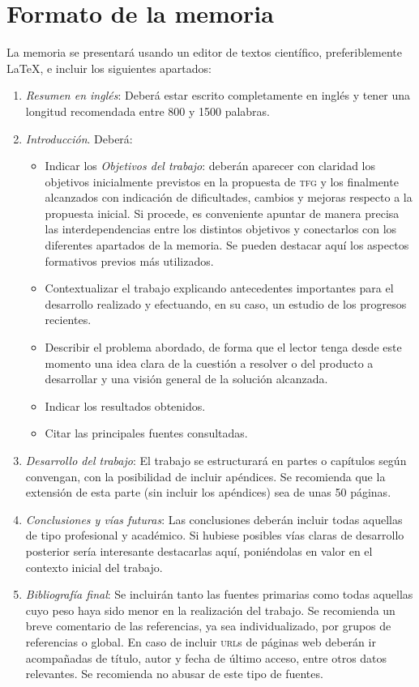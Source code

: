 \section{Formato de la memoria}
La memoria se presentará usando un editor de textos científico, preferiblemente \LaTeX, e incluir los siguientes apartados:
\begin{enumerate}
  \item \emph{Resumen en inglés}: Deberá estar escrito completamente en inglés y tener una longitud recomendada entre 800 y 1500 palabras. 
  \item \emph{Introducción}. Deberá:
    \begin{itemize}
      \item Indicar los \emph{Objetivos del trabajo}: deberán aparecer con claridad los objetivos inicialmente previstos en la propuesta de \textsc{tfg} y los finalmente alcanzados con indicación de dificultades, cambios y mejoras respecto a la propuesta inicial. Si procede, es conveniente apuntar de manera precisa las interdependencias entre los distintos objetivos y conectarlos con los diferentes apartados de la memoria. Se pueden destacar aquí los aspectos formativos previos más utilizados. 
    \item Contextualizar el trabajo explicando antecedentes importantes para el desarrollo realizado y efectuando, en su caso, un estudio de los progresos recientes.
    \item Describir el problema abordado, de forma que el lector tenga desde este momento una idea clara de la cuestión a resolver o del producto a desarrollar y una visión general de la solución alcanzada.
    \item Indicar los resultados obtenidos.
    \item Citar las principales fuentes consultadas.
    \end{itemize}

  \item \emph{Desarrollo del trabajo}: El trabajo se estructurará en partes o capítulos según convengan, con la posibilidad de incluir apéndices. Se recomienda que la extensión de esta parte (sin incluir los apéndices) sea de unas 50 páginas. 

  \item \emph{Conclusiones y vías futuras}: Las conclusiones deberán incluir todas aquellas de tipo profesional y académico. Si hubiese posibles vías claras de desarrollo posterior sería interesante destacarlas aquí, poniéndolas en valor en el contexto inicial del trabajo.

  \item \emph{Bibliografía final}: Se incluirán tanto las fuentes primarias como todas aquellas cuyo peso haya sido menor en la realización del trabajo. Se recomienda un breve comentario de las referencias, ya sea individualizado, por grupos de referencias o global. En caso de incluir \textsc{url}s de páginas web deberán ir acompañadas de título, autor y fecha de último acceso, entre otros datos relevantes. Se recomienda no abusar de este tipo de fuentes.
\end{enumerate}




